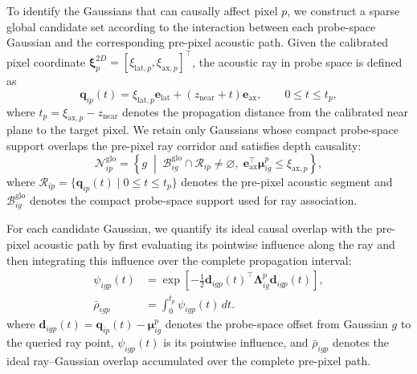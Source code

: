 To identify the Gaussians that can causally affect pixel $p$, we construct a
sparse global candidate set according to the interaction between each
probe-space Gaussian and the corresponding pre-pixel acoustic path. Given the
calibrated pixel coordinate
$\boldsymbol\xi^{2D}_{p}
=
[\xi_{\mathrm{lat},p},\xi_{\mathrm{ax},p}]^\top$,
the acoustic ray in probe space is defined as
\begin{equation}
\mathbf q_{ip}(t)
=
\xi_{\mathrm{lat},p}\mathbf e_{\mathrm{lat}}
+
\left(z_{\mathrm{near}}+t\right)\mathbf e_{\mathrm{ax}},
\qquad
0\leq t\leq t_p,
\label{eq:global-ray}
\end{equation}
where
$t_p=\xi_{\mathrm{ax},p}-z_{\mathrm{near}}$
denotes the propagation distance from the calibrated near plane to the target
pixel. We retain only Gaussians whose compact probe-space support overlaps the
pre-pixel ray corridor and satisfies depth causality:
\begin{equation}
\mathcal N^{\mathrm{glo}}_{ip}
=
\left\{
g
\;\middle|\;
\mathcal B^{\mathrm{glo}}_{ig}
\cap
\mathcal R_{ip}
\neq
\varnothing,\;
\mathbf e_{\mathrm{ax}}^\top
\boldsymbol\mu^{p}_{ig}
\leq
\xi_{\mathrm{ax},p}
\right\},
\label{eq:global-candidate-set}
\end{equation}
where
$\mathcal R_{ip}
=
\{\mathbf q_{ip}(t)\mid0\leq t\leq t_p\}$
denotes the pre-pixel acoustic segment and
$\mathcal B^{\mathrm{glo}}_{ig}$ denotes the compact probe-space support used
for ray association.

For each candidate Gaussian, we quantify its ideal causal overlap with the
pre-pixel acoustic path by first evaluating its pointwise influence along the
ray and then integrating this influence over the complete propagation
interval:
\begin{equation}
\begin{aligned}
\psi_{igp}(t)
&=
\exp
\left[
-\frac{1}{2}
\mathbf d_{igp}(t)^\top
\boldsymbol\Lambda^{p}_{ig}
\mathbf d_{igp}(t)
\right],
\\
\bar{\rho}_{igp}
&=
\int_{0}^{t_p}
\psi_{igp}(t)\,dt.
\end{aligned}
\label{eq:causal-ray-overlap-ideal}
\end{equation}
where
$\mathbf d_{igp}(t)
=
\mathbf q_{ip}(t)-\boldsymbol\mu^{p}_{ig}$
denotes the probe-space offset from Gaussian $g$ to the queried ray point,
$\psi_{igp}(t)$ is its pointwise influence, and $\bar{\rho}_{igp}$ denotes the
ideal ray--Gaussian overlap accumulated over the complete pre-pixel path.

